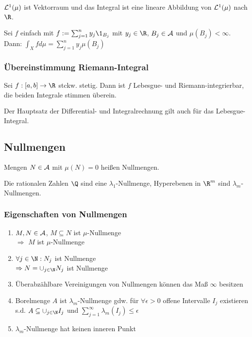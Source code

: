 $\mathcal{L}^1(\mu)$ ist Vektorraum und das Integral ist eine lineare Abbildung von $\mathcal{L}^1(\mu)$ nach $\R$.

\spacing

Sei $f$ einfach mit $f := \sum_{j=1}^n y_j \1_{B_j}$ mit $y_j \in \R$, $B_j \in \mathcal{A}$ und $\mu(B_j) < \infty$. Dann: $\int_X f d\mu = \sum_{j=1}^n y_j \mu(B_j)$

\subsubsection*{Übereinstimmung Riemann-Integral}

Sei $f : [a,b] \to \R$ stckw. stetig. Dann ist $f$ Lebesgue- und Riemann-integrierbar, die beiden Integrale stimmen überein.

Der Hauptsatz der Differential- und Integralrechnung gilt auch für das Lebesgue-Integral.

\subsection*{Nullmengen}

Mengen $N \in \mathcal{A}$ mit $\mu(N) = 0$ heißen Nullmengen.

Die rationalen Zahlen $\Q$ sind eine $\lambda_1$-Nullmenge, Hyperebenen in $\R^m$ sind $\lambda_m$-Nullmengen.

\subsubsection*{Eigenschaften von Nullmengen}

\begin{enumerate}[label=(\alph*)]
	\item $M, N \in \mathcal{A}$, $M \subseteq N$ ist $\mu$-Nullmenge \\ $\Rightarrow$ $M$ ist $\mu$-Nullmenge
	\item $\forall j \in \N : N_j$ ist Nullmenge \\ $\Rightarrow N = \cup_{j \in \N} N_j$ ist Nullmenge
	\item Überabzählbare Vereinigungen von Nullmengen können das Maß $\infty$ besitzen
	\item Borelmenge $A$ ist $\lambda_m$-Nullmenge gdw. für $\forall \epsilon > 0$  offene Intervalle $I_j$ existieren s.d. $A \subseteq \cup_{j \in \N} I_j$ und $\sum_{j=1}^\infty \lambda_m(I_j) \leq \epsilon$
	\item $\lambda_m$-Nullmenge hat keinen inneren Punkt
\end{enumerate}

